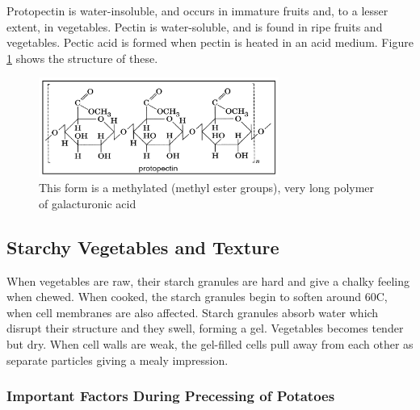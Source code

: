 \vspace{0.5em}
Protopectin is water-insoluble, and occurs in immature fruits and, to a lesser extent, in vegetables. Pectin is water-soluble, and is found in ripe fruits and vegetables. Pectic acid is formed when pectin is heated in an acid medium. Figure \ref{fig:L01_propectin} shows the structure of these.

\begin{figure}[h]
    \centering
    \includegraphics[width=0.7\textwidth]{figures/L01_propectin.png}
    \caption{This form is a methylated (methyl ester groups), very long polymer of galacturonic acid}
    \label{fig:L01_propectin}
\end{figure}

\subsection*{Starchy Vegetables and Texture}
When vegetables are raw, their starch granules are hard and give a chalky feeling when chewed. When cooked, the starch granules begin to soften around 60\textdegree C, when cell membranes are also affected. Starch granules absorb water which disrupt their structure and they swell, forming a gel. Vegetables becomes tender but dry. When cell walls are weak, the gel-filled cells pull away from each other as separate particles giving a mealy impression.

\subsubsection*{Important Factors During Precessing of Potatoes}

